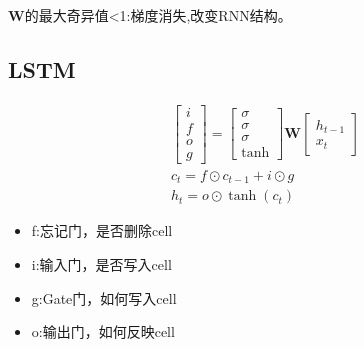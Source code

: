 \documentclass{article}
\begin{document}
$\mathbf{W}$的最大奇异值<1:梯度消失,改变RNN结构。
\subsection{LSTM}
\begin{equation*}
\begin{split}
&\begin{bmatrix}i\\f\\o\\g\end{bmatrix}=\begin{bmatrix}\sigma\\\sigma\\\sigma\\\tanh\end{bmatrix}\mathbf{W}\begin{bmatrix}h_{t-1}\\x_t\end{bmatrix}\\
&c_t = f\odot c_{t-1}+i\odot g\\
&h_t = o\odot\tanh(c_t)
\end{split}
\end{equation*}
\begin{itemize}
	\item f:忘记门，是否删除cell
	\item i:输入门，是否写入cell
	\item g:Gate门，如何写入cell
	\item o:输出门，如何反映cell
\end{itemize}
\end{document}
